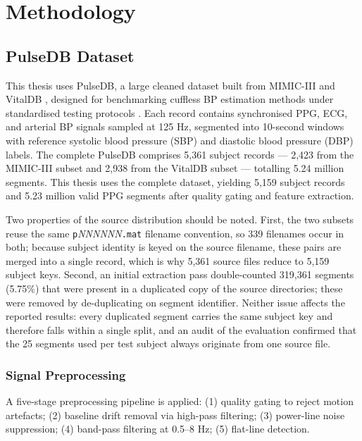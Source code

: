 \chapter{Methodology}
\label{ch:methodology}

\section{PulseDB Dataset}

This thesis uses PulseDB, a large cleaned dataset built from MIMIC-III \citep{mimic2016} and VitalDB \citep{vitaldb2022}, designed for benchmarking cuffless BP estimation methods under standardised testing protocols \citep{pulsedb2023}. Each record contains synchronised PPG, ECG, and arterial BP signals sampled at 125 Hz, segmented into 10-second windows with reference systolic blood pressure (SBP) and diastolic blood pressure (DBP) labels. The complete PulseDB comprises 5,361 subject records --- 2,423 from the MIMIC-III subset and 2,938 from the VitalDB subset --- totalling 5.24 million segments. This thesis uses the complete dataset, yielding 5,159 subject records and 5.23 million valid PPG segments after quality gating and feature extraction.

Two properties of the source distribution should be noted. First, the two subsets reuse the same \texttt{p}\textit{NNNNNN}\texttt{.mat} filename convention, so 339 filenames occur in both; because subject identity is keyed on the source filename, these pairs are merged into a single record, which is why 5,361 source files reduce to 5,159 subject keys. Second, an initial extraction pass double-counted 319,361 segments (5.75\%) that were present in a duplicated copy of the source directories; these were removed by de-duplicating on segment identifier. Neither issue affects the reported results: every duplicated segment carries the same subject key and therefore falls within a single split, and an audit of the evaluation confirmed that the 25 segments used per test subject always originate from one source file.

\subsection{Signal Preprocessing}

A five-stage preprocessing pipeline is applied: (1) quality gating to reject motion artefacts; (2) baseline drift removal via high-pass filtering; (3) power-line noise suppression; (4) band-pass filtering at 0.5--8 Hz; (5) flat-line detection.

